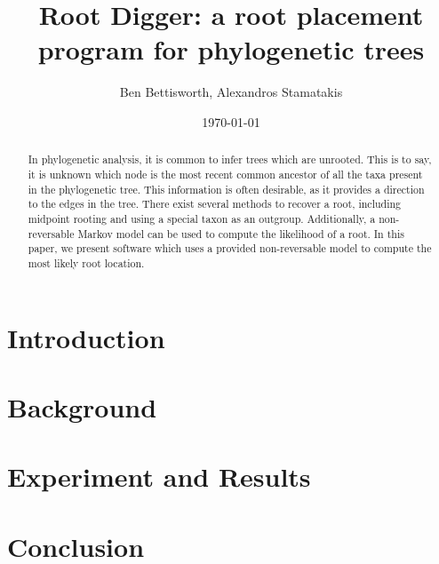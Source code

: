 \documentclass{article}
\title{Root Digger: a root placement program for phylogenetic trees}
\author{Ben Bettisworth, Alexandros Stamatakis}
\date{\today}
\begin{document}
\begin{abstract}
In phylogenetic analysis, it is common to infer trees which are unrooted. This
is to say, it is unknown which node is the most recent common ancestor of all
the taxa present in the phylogenetic tree. This information is often desirable,
as it provides a direction to the edges in the tree.  There exist several
methods to recover a root, including midpoint rooting and using a special taxon
as an outgroup. Additionally, a non-reversable Markov model can be used to
compute the likelihood of a root. In this paper, we present software which uses
a provided non-reversable model to compute the most likely root location.
\end{abstract}

\maketitle

\section{Introduction}



\section{Background}

\section{Experiment and Results}

\section{Conclusion}
\end{document}
